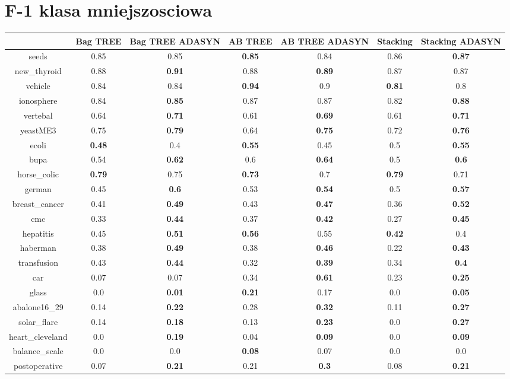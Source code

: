 \documentclass{article}%
\begin{document}
%
\section*{F{-}1 klasa mniejszosciowa}%
\begin{tabular}{c|cccccc}%
&Bag TREE&Bag TREE ADASYN&AB TREE&AB TREE ADASYN&Stacking&Stacking ADASYN\\%
\hline%
seeds&0.85&0.85&\textbf{0.85}&0.84&0.86&\textbf{0.87}\\%
new\_thyroid&0.88&\textbf{0.91}&0.88&\textbf{0.89}&0.87&0.87\\%
vehicle&0.84&0.84&\textbf{0.94}&0.9&\textbf{0.81}&0.8\\%
ionosphere&0.84&\textbf{0.85}&0.87&0.87&0.82&\textbf{0.88}\\%
vertebal&0.64&\textbf{0.71}&0.61&\textbf{0.69}&0.61&\textbf{0.71}\\%
yeastME3&0.75&\textbf{0.79}&0.64&\textbf{0.75}&0.72&\textbf{0.76}\\%
ecoli&\textbf{0.48}&0.4&\textbf{0.55}&0.45&0.5&\textbf{0.55}\\%
bupa&0.54&\textbf{0.62}&0.6&\textbf{0.64}&0.5&\textbf{0.6}\\%
horse\_colic&\textbf{0.79}&0.75&\textbf{0.73}&0.7&\textbf{0.79}&0.71\\%
german&0.45&\textbf{0.6}&0.53&\textbf{0.54}&0.5&\textbf{0.57}\\%
breast\_cancer&0.41&\textbf{0.49}&0.43&\textbf{0.47}&0.36&\textbf{0.52}\\%
cmc&0.33&\textbf{0.44}&0.37&\textbf{0.42}&0.27&\textbf{0.45}\\%
hepatitis&0.45&\textbf{0.51}&\textbf{0.56}&0.55&\textbf{0.42}&0.4\\%
haberman&0.38&\textbf{0.49}&0.38&\textbf{0.46}&0.22&\textbf{0.43}\\%
transfusion&0.43&\textbf{0.44}&0.32&\textbf{0.39}&0.34&\textbf{0.4}\\%
car&0.07&0.07&0.34&\textbf{0.61}&0.23&\textbf{0.25}\\%
glass&0.0&\textbf{0.01}&\textbf{0.21}&0.17&0.0&\textbf{0.05}\\%
abalone16\_29&0.14&\textbf{0.22}&0.28&\textbf{0.32}&0.11&\textbf{0.27}\\%
solar\_flare&0.14&\textbf{0.18}&0.13&\textbf{0.23}&0.0&\textbf{0.27}\\%
heart\_cleveland&0.0&\textbf{0.19}&0.04&\textbf{0.09}&0.0&\textbf{0.09}\\%
balance\_scale&0.0&0.0&\textbf{0.08}&0.07&0.0&0.0\\%
postoperative&0.07&\textbf{0.21}&0.21&\textbf{0.3}&0.08&\textbf{0.21}\\%
\end{tabular}
\end{document}
